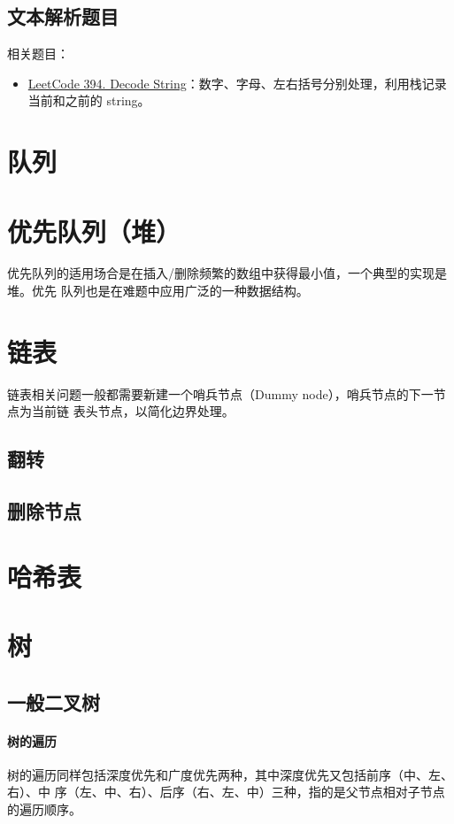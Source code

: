 \subsection{文本解析题目}

相关题目：

\begin{itemize}
  \item
    \href{https://leetcode.com/problems/decode-string/}{LeetCode 394. Decode
      String}：数字、字母、左右括号分别处理，利用栈记录当前和之前的 string。
\end{itemize}

\section{队列}

\section{优先队列（堆）}
优先队列的适用场合是在插入/删除频繁的数组中获得最小值，一个典型的实现是堆。优先
队列也是在难题中应用广泛的一种数据结构。

\section{链表}
链表相关问题一般都需要新建一个哨兵节点（Dummy node），哨兵节点的下一节点为当前链
表头节点，以简化边界处理。

\subsection{翻转}

\subsection{删除节点}

\section{哈希表}

\section{树}

\subsection{一般二叉树}
\paragraph{树的遍历}
树的遍历同样包括深度优先和广度优先两种，其中深度优先又包括前序（中、左、右）、中
序（左、中、右）、后序（右、左、中）三种，指的是父节点相对子节点的遍历顺序。

